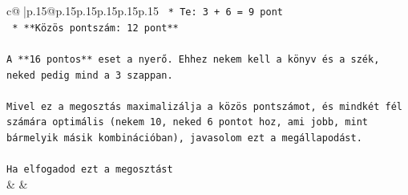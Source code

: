 \documentclass{article}
\begin{document}
{\begin{supertabular}{c@{$\;$}|p{.15\linewidth}@{}p{.15\linewidth}p{.15\linewidth}p{.15\linewidth}p{.15\linewidth}p{.15\linewidth}}
{{{\texttt{    *   Te: 3 + 6 = 9 pont} \\
\texttt{    *   **Közös pontszám: 12 pont**} \\
\\ 
\texttt{A **16 pontos** eset a nyerő. Ehhez nekem kell a könyv és a szék, neked pedig mind a 3 szappan.} \\
\\ 
\texttt{Mivel ez a megosztás maximalizálja a közös pontszámot, és mindkét fél számára optimális (nekem 10, neked 6 pontot hoz, ami jobb, mint bármelyik másik kombinációban), javasolom ezt a megállapodást.} \\
\\ 
\texttt{Ha elfogadod ezt a megosztást} \\
            }
        }
    }
    & & \\ \\


\end{supertabular}}
\end{document}
